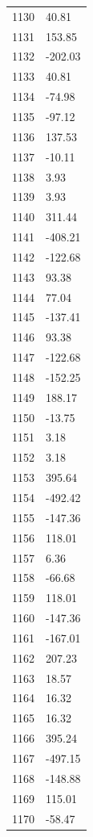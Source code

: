 \documentclass[a4paper,11pt]{article}
\begin{document}
\begin{center}
\begin{longtable}{|R{1.5cm}|R{2.5cm}|}
 1130 &        40.81 \\
 1131 &       153.85 \\
 1132 &      -202.03 \\
 1133 &        40.81 \\
 1134 &       -74.98 \\
 1135 &       -97.12 \\
 1136 &       137.53 \\
 1137 &       -10.11 \\
 1138 &         3.93 \\
 1139 &         3.93 \\
 1140 &       311.44 \\
 1141 &      -408.21 \\
 1142 &      -122.68 \\
 1143 &        93.38 \\
 1144 &        77.04 \\
 1145 &      -137.41 \\
 1146 &        93.38 \\
 1147 &      -122.68 \\
 1148 &      -152.25 \\
 1149 &       188.17 \\
 1150 &       -13.75 \\
 1151 &         3.18 \\
 1152 &         3.18 \\
 1153 &       395.64 \\
 1154 &      -492.42 \\
 1155 &      -147.36 \\
 1156 &       118.01 \\
 1157 &         6.36 \\
 1158 &       -66.68 \\
 1159 &       118.01 \\
 1160 &      -147.36 \\
 1161 &      -167.01 \\
 1162 &       207.23 \\
 1163 &        18.57 \\
 1164 &        16.32 \\
 1165 &        16.32 \\
 1166 &       395.24 \\
 1167 &      -497.15 \\
 1168 &      -148.88 \\
 1169 &       115.01 \\
 1170 &       -58.47 \\

\end{longtable}
\end{center}
\end{document}
